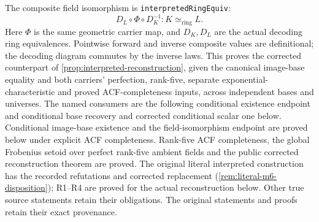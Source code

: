 \documentclass[11pt,oneside]{article}
\theoremstyle{definition}
\theoremstyle{remark}
\newcommand{\lean}[1]{\nolinkurl{#1}}
\begin{document}
The composite field isomorphism is \lean{interpretedRingEquiv}:
\[
 D_L\circ\Phi\circ D_K^{-1}:K\simeq_{\mathrm{ring}}L.
\]
Here $\Phi$ is the same geometric carrier map, and $D_K,D_L$ are the actual decoding
ring equivalences. Pointwise forward and inverse composite values are definitional;
the decoding diagram commutes by the inverse laws. This proves the corrected counterpart of
\cref{prop:interpreted-reconstruction}, given the canonical
image-base equality and both carriers' perfection, rank-five, separate exponential-
characteristic and proved ACF-completeness inputs, across independent bases and universes.
The named consumers are the following conditional existence endpoint and conditional base
recovery and corrected conditional scalar one below.
Conditional image-base existence and the field-isomorphism endpoint are proved below under
explicit ACF completeness. Rank-five ACF completeness, the global Frobenius setoid over
perfect rank-five ambient fields and the public corrected reconstruction theorem are
proved. The original literal interpreted construction has the recorded refutations and
corrected replacement (\cref{rem:literal-m6-disposition}); R1--R4 are proved for the
actual reconstruction below. Other true source statements retain their obligations.
The original statements and proofs retain their exact provenance.
\end{document}
